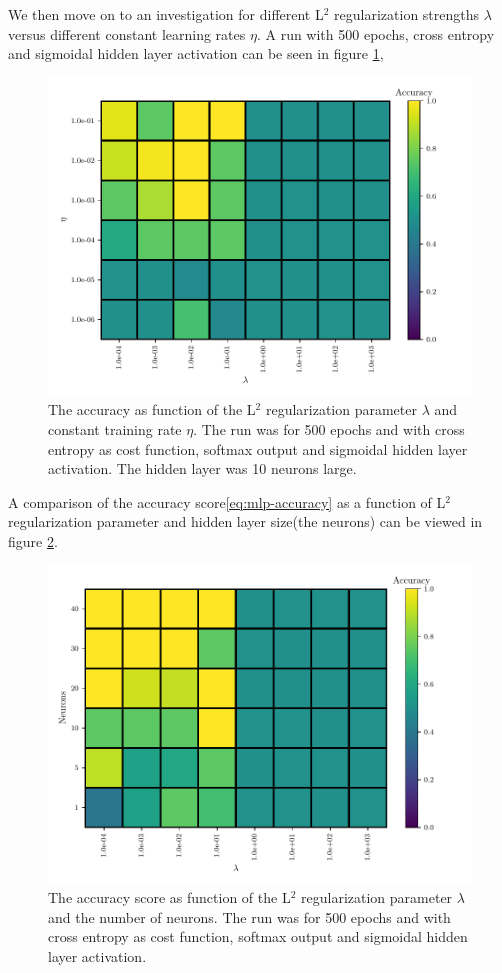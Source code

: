 We then move on to an investigation for different L$^2$ regularization strengths $\lambda$ versus different constant learning rates $\eta$. A run with 500 epochs, cross entropy and sigmoidal hidden layer activation can be seen in figure \ref{fig:mlp-eta-lambda},
\begin{figure}[H]
    \centering
    \includegraphics[scale=1.0]{../fig/mlp_lambda_eta.pdf}
    \caption{The accuracy as function of the L$^2$ regularization parameter $\lambda$ and constant training rate $\eta$. The run was for 500 epochs and with cross entropy as cost function, softmax output and sigmoidal hidden layer activation. The hidden layer was 10 neurons large.}
    \label{fig:mlp-eta-lambda}
\end{figure}

A comparison of the accuracy score\eqref{eq:mlp-accuracy} as a function of L$^2$ regularization parameter and hidden layer size(the neurons) can be viewed in figure \ref{fig:mlp-lambda-neurons}.
\begin{figure}[H]
    \centering
    \includegraphics[scale=1.0]{../fig/mlp_lambda_neurons.pdf}
    \caption{The accuracy score as function of the L$^2$ regularization parameter $\lambda$ and the number of neurons. The run was for 500 epochs and with cross entropy as cost function, softmax output and sigmoidal hidden layer activation.}
    \label{fig:mlp-lambda-neurons}
\end{figure}

